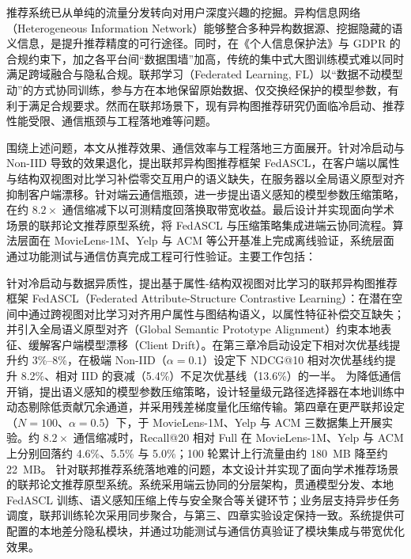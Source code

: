 \setlength{\parindent}{2em}
{\fontsize{12pt}{18pt}\selectfont\songti
推荐系统已从单纯的流量分发转向对用户深度兴趣的挖掘。异构信息网络（Heterogeneous Information Network）能够整合多种异构数据源、挖掘隐藏的语义信息，是提升推荐精度的可行途径。同时，在《个人信息保护法》与 GDPR 的合规约束下，加之各平台间“数据围墙”加高，传统的集中式大图训练模式难以同时满足跨域融合与隐私合规。联邦学习（Federated Learning, FL）以“数据不动模型动”的方式协同训练，参与方在本地保留原始数据、仅交换经保护的模型参数，有利于满足合规要求。然而在联邦场景下，现有异构图推荐研究仍面临冷启动、推荐性能受限、通信瓶颈与工程落地难等问题。

围绕上述问题，本文从推荐效果、通信效率与工程落地三方面展开。针对冷启动与 Non-IID 导致的效果退化，提出联邦异构图推荐框架 FedASCL，在客户端以属性与结构双视图对比学习补偿零交互用户的语义缺失，在服务器以全局语义原型对齐抑制客户端漂移。针对端云通信瓶颈，进一步提出语义感知的模型参数压缩策略，在约 $8.2\times$ 通信缩减下以可测精度回落换取带宽收益。最后设计并实现面向学术场景的联邦论文推荐原型系统，将 FedASCL 与压缩策略集成进端云协同流程。算法层面在 MovieLens-1M、Yelp 与 ACM 等公开基准上完成离线验证，系统层面通过功能测试与通信仿真完成工程可行性验证。主要工作包括：
\begin{cnenumerate}
    \cnitem 针对冷启动与数据异质性，提出基于属性-结构双视图对比学习的联邦异构图推荐框架 FedASCL（Federated Attribute-Structure Contrastive Learning）：在潜在空间中通过跨视图对比学习对齐用户属性与图结构语义，以属性特征补偿交互缺失；并引入全局语义原型对齐（Global Semantic Prototype Alignment）约束本地表征、缓解客户端模型漂移（Client Drift）。在第三章冷启动设定下相对次优基线提升约 3\%--8\%，在极端 Non-IID（$\alpha=0.1$）设定下 NDCG@10 相对次优基线约提升 8.2\%、相对 IID 的衰减（5.4\%）不足次优基线（13.6\%）的一半。
    \cnitem 为降低通信开销，提出语义感知的模型参数压缩策略，设计轻量级元路径选择器在本地训练中动态剔除低贡献冗余通道，并采用残差梯度量化压缩传输。第四章在更严联邦设定（$N{=}100$、$\alpha{=}0.5$）下，于 MovieLens-1M、Yelp 与 ACM 三数据集上开展实验。约 $8.2\times$ 通信缩减时，Recall@20 相对 Full 在 MovieLens-1M、Yelp 与 ACM 上分别回落约 4.6\%、5.5\% 与 5.0\%；100 轮累计上行流量由约 180~MB 降至约 22~MB。
    \cnitem 针对联邦推荐系统落地难的问题，本文设计并实现了面向学术推荐场景的联邦论文推荐原型系统。系统采用端云协同的分层架构，贯通模型分发、本地 FedASCL 训练、语义感知压缩上传与安全聚合等关键环节；业务层支持异步任务调度，联邦训练轮次采用同步聚合，与第三、四章实验设定保持一致。系统提供可配置的本地差分隐私模块，并通过功能测试与通信仿真验证了模块集成与带宽优化效果。
\end{cnenumerate}
\par
}

